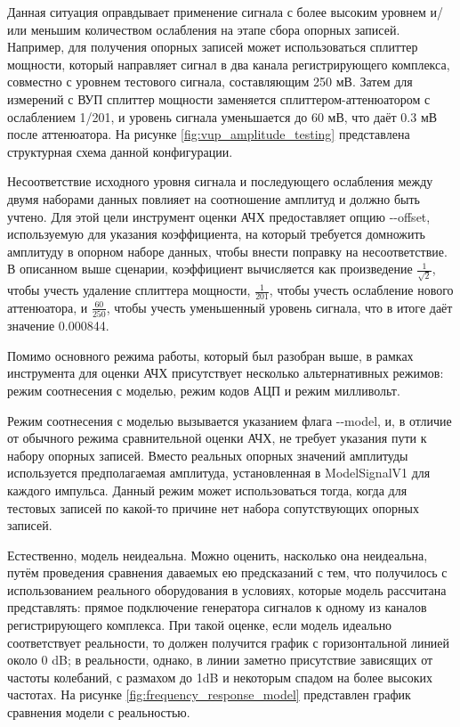 \documentclass{report}
\begin{document}
Данная ситуация оправдывает применение сигнала с более высоким уровнем и/или меньшим количеством ослабления на этапе сбора опорных записей. Например, для получения опорных записей может использоваться сплиттер мощности, который направляет сигнал в два канала регистрирующего комплекса, совместно с уровнем тестового сигнала, составляющим 250 мВ. Затем для измерений с ВУП сплиттер мощности заменяется сплиттером-аттенюатором с ослаблением 1/201, и уровень сигнала уменьшается до 60 мВ, что даёт 0.3 мВ после аттенюатора. На рисунке \ref{fig:vup_amplitude_testing} представлена структурная схема данной конфигурации.


Несоответствие исходного уровня сигнала и последующего ослабления между двумя наборами данных повлияет на соотношение амплитуд и должно быть учтено. Для этой цели инструмент оценки АЧХ предоставляет опцию -{}-offset, используемую для указания коэффициента, на который требуется домножить амплитуду в опорном наборе данных, чтобы внести поправку на несоответствие. В описанном выше сценарии, коэффициент вычисляется как произведение $\frac{1}{\sqrt{2}}$, чтобы учесть удаление сплиттера мощности, $\frac{1}{201}$, чтобы учесть ослабление нового аттенюатора, и $\frac{60}{250}$, чтобы учесть уменьшенный уровень сигнала, что в итоге даёт значение 0.000844.

Помимо основного режима работы, который был разобран выше, в рамках инструмента для оценки АЧХ присутствует несколько альтернативных режимов: режим соотнесения с моделью, режим кодов АЦП и режим милливольт.

Режим соотнесения с моделью вызывается указанием флага -{}-model, и, в отличие от обычного режима сравнительной оценки АЧХ, не требует указания пути к набору опорных записей. Вместо реальных опорных значений амплитуды используется предполагаемая амплитуда, установленная в ModelSignalV1 для каждого импульса. Данный режим может использоваться тогда, когда для тестовых записей по какой-то причине нет набора сопутствующих опорных записей.

Естественно, модель неидеальна. Можно оценить, насколько она неидеальна, путём проведения сравнения даваемых ею предсказаний с тем, что получилось с использованием реального оборудования в условиях, которые модель рассчитана представлять: прямое подключение генератора сигналов к одному из каналов регистрирующего комплекса. При такой оценке, если модель идеально соответствует реальности, то должен получится график с горизонтальной линией около 0 dB; в реальности, однако, в линии заметно присутствие зависящих от частоты колебаний, с размахом до 1dB и некоторым спадом на более высоких частотах. На рисунке \ref{fig:frequency_response_model} представлен график сравнения модели с реальностью.
\end{document}
